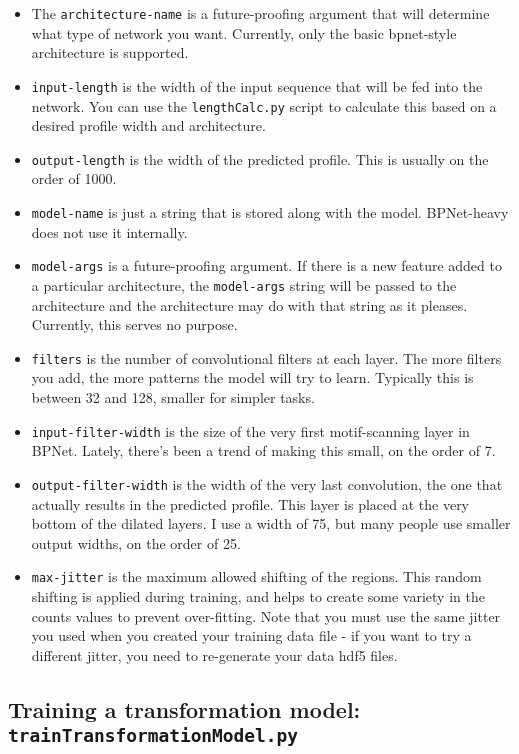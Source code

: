 \documentclass{article}
\begin{document}
\begin{itemize}
    \item The \texttt{architecture-name} is a future-proofing argument that will determine what type of network you want. Currently, only the basic bpnet-style architecture is supported.
    \item \texttt{input-length} is the width of the input sequence that will be fed into the network. You can use the \texttt{lengthCalc.py} script to calculate this based on a desired profile width and architecture.
    \item \texttt{output-length} is the width of the predicted profile. This is usually on the order of 1000.
    \item \texttt{model-name} is just a string that is stored along with the model. BPNet-heavy does not use it internally.
    \item \texttt{model-args} is a future-proofing argument. If there is a new feature added to a particular architecture, the \texttt{model-args} string will be passed to the architecture and the architecture may do with that string as it pleases. Currently, this serves no purpose.
    \item \texttt{filters} is the number of convolutional filters at each layer. The more filters you add, the more patterns the model will try to learn. Typically this is between 32 and 128, smaller for simpler tasks.
    \item \texttt{input-filter-width} is the size of the very first motif-scanning layer in BPNet. Lately, there's been a trend of making this small, on the order of 7.
    \item \texttt{output-filter-width} is the width of the very last convolution, the one that actually results in the predicted profile. This layer is placed at the very bottom of the dilated layers. I use a width of 75, but many people use smaller output widths, on the order of 25.
    \item \texttt{max-jitter} is the maximum allowed shifting of the regions. This random shifting is applied during training, and helps to create some variety in the counts values to prevent over-fitting. Note that you must use the same jitter you used when you created your training data file - if you want to try a different jitter, you need to re-generate your data hdf5 files.
\end{itemize}

\newpage

\subsection{Training a transformation model: \texttt{trainTransformationModel.py}}
\end{document}
